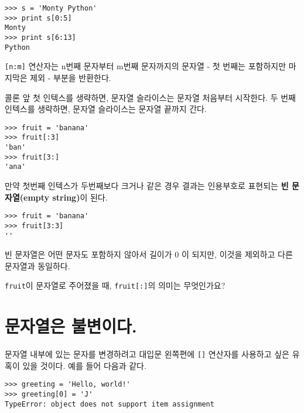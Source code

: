 \beforeverb
\begin{verbatim}
>>> s = 'Monty Python'
>>> print s[0:5]
Monty
>>> print s[6:13]
Python
\end{verbatim}
\afterverb
%

{\tt [n:m]} 연산자는 n번째 문자부터 m번째 문자까지의 문자열 - 첫 번째는 포함하지만 마지막은 제외 - 부분을 반환한다.

콜론 앞 첫 인텍스를 생략하면, 문자열 슬라이스는 문자열 처음부터 시작한다.
두 번째 인텍스를 생략하면, 문자열 슬라이스는 문자열 끝까지 간다. 

\beforeverb
\begin{verbatim}
>>> fruit = 'banana'
>>> fruit[:3]
'ban'
>>> fruit[3:]
'ana'
\end{verbatim}
\afterverb
%

만약 첫번째 인텍스가 두번째보다 크거나 같은 경우 결과는 인용부호로 표현되는 {\bf 빈 문자열(empty string)}이 된다.


\beforeverb
\begin{verbatim}
>>> fruit = 'banana'
>>> fruit[3:3]
''
\end{verbatim}
\afterverb
%

빈 문자열은 어떤 문자도 포함하지 않아서 길이가 0 이 되지만, 이것을 제외하고 다른 문자열과 동일하다.

\begin{ex}
{\tt fruit}이 문자열로 주어졌을 때, {\tt fruit[:]}의 의미는 무엇인가요?


\end{ex}


\section{    문자열은 불변이다.}

문자열 내부에 있는 문자를 변경하려고 대입문 왼쪽편에 {\tt []} 연산자를 사용하고 싶은 유혹이 있을 것이다.
예를 들어 다음과 같다.


\beforeverb
\begin{verbatim}
>>> greeting = 'Hello, world!'
>>> greeting[0] = 'J'
TypeError: object does not support item assignment
\end{verbatim}
\afterverb
%

